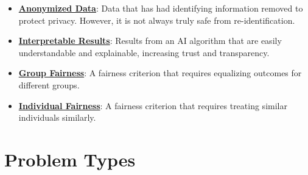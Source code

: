 \documentclass{article}%
\begin{document}
\begin{itemize}[leftmargin=*]
\item \href{https://purdue.brightspace.com/d2l/common/assets/pdfjs-d2l-dist/1.0.14-legacy/web/viewer.html?file=\%2Fcontent\%2Fenforced\%2F1095467-wl.202510.CS.24300.001\%2F16L2-ethics.pdf\%3Fou\%3D1095467\&lang=en-us\&container=d2l-fileviewer-rendered-pdf\&fullscreen=d2l-fileviewer-rendered-pdf-dialog\&height=667#page=10}{\textbf{Anonymized Data}}: Data that has had identifying information removed to protect privacy. However, it is not always truly safe from re-identification.%
\item \href{https://purdue.brightspace.com/d2l/common/assets/pdfjs-d2l-dist/1.0.14-legacy/web/viewer.html?file=\%2Fcontent\%2Fenforced\%2F1095467-wl.202510.CS.24300.001\%2F16L2-ethics.pdf\%3Fou\%3D1095467\&lang=en-us\&container=d2l-fileviewer-rendered-pdf\&fullscreen=d2l-fileviewer-rendered-pdf-dialog\&height=667#page=28}{\textbf{Interpretable Results}}: Results from an AI algorithm that are easily understandable and explainable, increasing trust and transparency.%
\item \href{https://purdue.brightspace.com/d2l/common/assets/pdfjs-d2l-dist/1.0.14-legacy/web/viewer.html?file=\%2Fcontent\%2Fenforced\%2F1095467-wl.202510.CS.24300.001\%2F16L2-ethics.pdf\%3Fou\%3D1095467\&lang=en-us\&container=d2l-fileviewer-rendered-pdf\&fullscreen=d2l-fileviewer-rendered-pdf-dialog\&height=667#page=26}{\textbf{Group Fairness}}: A fairness criterion that requires equalizing outcomes for different groups.%
\item \href{https://purdue.brightspace.com/d2l/common/assets/pdfjs-d2l-dist/1.0.14-legacy/web/viewer.html?file=\%2Fcontent\%2Fenforced\%2F1095467-wl.202510.CS.24300.001\%2F16L2-ethics.pdf\%3Fou\%3D1095467\&lang=en-us\&container=d2l-fileviewer-rendered-pdf\&fullscreen=d2l-fileviewer-rendered-pdf-dialog\&height=667#page=27}{\textbf{Individual Fairness}}: A fairness criterion that requires treating similar individuals similarly.%
\end{itemize}

%
\section{Problem Types}%
\label{sec:ProblemTypes}%
\end{document}
